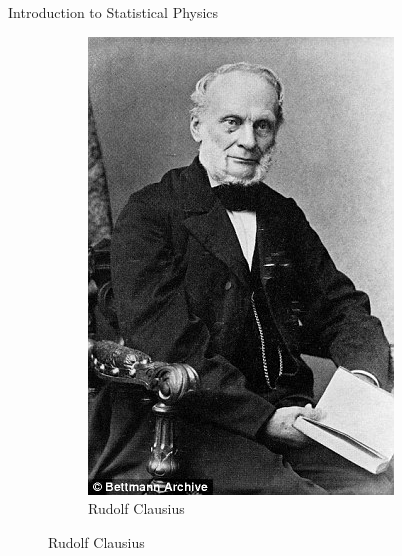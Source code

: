 \documentclass{beamer}
\begin{document}
\begin{frame}{Introduction to Statistical Physics}
\begin{figure}[h!]
\begin{subfigure}[b]{0.25\linewidth}
    \includegraphics[width=\linewidth]{figures/clausius.jpeg}
    \caption{Rudolf Clausius~\cite{clausius}}
  \end{subfigure}
  \label{fig:the-greats}
\end{figure}
\end{frame}

\end{document}
